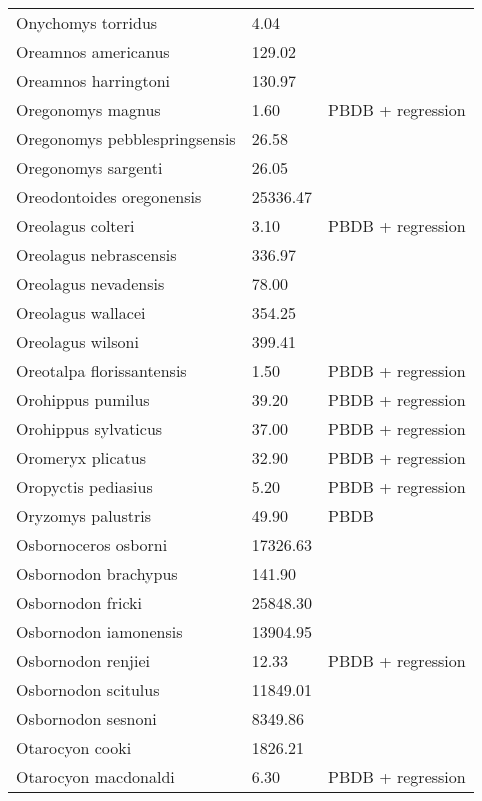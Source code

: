 \begin{longtable}{p{} p{} p{}}
    Onychomys torridus & 4.04 & \cite{Smith2004} \\ 
    Oreamnos americanus & 129.02 & \cite{Smith2004} \\ 
    Oreamnos harringtoni & 130.97 & \cite{Smith2004} \\ 
    Oregonomys magnus & 1.60 & PBDB + regression \\ 
    Oregonomys pebblespringsensis & 26.58 & \cite{Tomiya2013} \\ 
    Oregonomys sargenti & 26.05 & \cite{Tomiya2013} \\ 
    Oreodontoides oregonensis & 25336.47 & \cite{Tomiya2013} \\ 
    Oreolagus colteri & 3.10 & PBDB + regression \\ 
    Oreolagus nebrascensis & 336.97 & \cite{Tomiya2013} \\ 
    Oreolagus nevadensis & 78.00 & \cite{McKenna2011} \\ 
    Oreolagus wallacei & 354.25 & \cite{Tomiya2013} \\ 
    Oreolagus wilsoni & 399.41 & \cite{Tomiya2013} \\ 
    Oreotalpa florissantensis & 1.50 & PBDB + regression \\ 
    Orohippus pumilus & 39.20 & PBDB + regression \\ 
    Orohippus sylvaticus & 37.00 & PBDB + regression \\ 
    Oromeryx plicatus & 32.90 & PBDB + regression \\ 
    Oropyctis pediasius & 5.20 & PBDB + regression \\ 
    Oryzomys palustris & 49.90 & PBDB \\ 
    Osbornoceros osborni & 17326.63 & \cite{Tomiya2013} \\ 
    Osbornodon brachypus & 141.90 & \cite{Chester2012} \\ 
    Osbornodon fricki & 25848.30 & \cite{Tomiya2013} \\ 
    Osbornodon iamonensis & 13904.95 & \cite{Tomiya2013} \\ 
    Osbornodon renjiei & 12.33 & PBDB + regression \\ 
    Osbornodon scitulus & 11849.01 & \cite{Tomiya2013} \\ 
    Osbornodon sesnoni & 8349.86 & \cite{Tomiya2013} \\ 
    Otarocyon cooki & 1826.21 & \cite{Tomiya2013} \\ 
    Otarocyon macdonaldi & 6.30 & PBDB + regression \\ 

\end{longtable}
